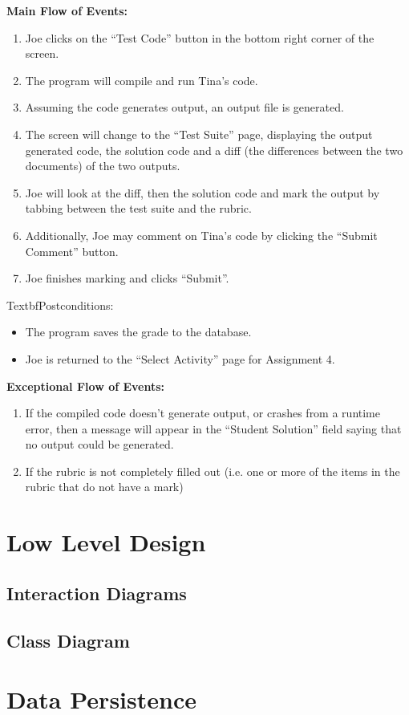\documentclass{article}
\begin{document}
\textbf{Main Flow of Events:}
\begin{enumerate} 
	\item Joe clicks on the “Test Code” button in the bottom right corner of the screen.
	\item The program will compile and run Tina’s  code.
	\item Assuming the code generates output, an output file is generated.
	\item The screen will change to the “Test Suite” page, displaying the output 
		generated code, the solution code and a diff (the differences between the 
		two documents) of the two outputs.
	\item Joe will look at the diff, then the solution code and mark the output by
		tabbing between the test suite and the rubric.	
	\item Additionally, Joe may comment on Tina’s code by 	clicking the “Submit 
		Comment” button.
	\item Joe finishes marking and clicks “Submit”.
\end{enumerate}

Textbf{Postconditions:}

\begin{itemize}
\item The program saves the grade to the database. 
\item Joe is returned to the “Select Activity” page for Assignment 4.
\end{itemize}

\textbf{Exceptional Flow of Events:}
\begin{enumerate}
 	\item If the compiled code doesn’t generate output, or crashes from a runtime 
 		error, then a message will appear in the “Student Solution” field saying that  
 		no output could be generated.
	\item If the rubric is not completely filled out (i.e. one or more of the items in the 
		rubric that do not have a mark)
\end{enumerate}

\section{Low Level Design}
\subsection{Interaction Diagrams}
\subsection{Class Diagram}

\section{Data Persistence}
\end{document}

